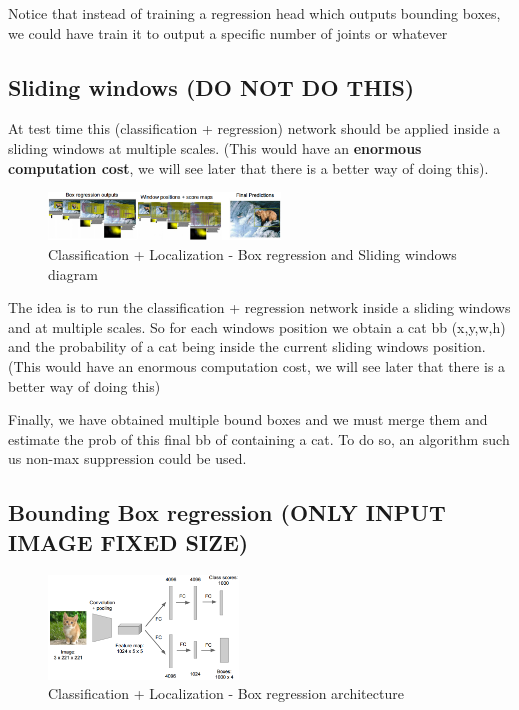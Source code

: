Notice that instead of training a regression head which outputs bounding boxes, we could have train it to output a specific number of joints or whatever

\subsection*{Sliding windows (DO NOT DO THIS)}
At test time this (classification + regression) network should be applied inside a sliding windows at multiple scales. (This would have an \textbf{enormous computation cost}, we will see later that there is a better way of doing this).

\begin{figure}[h]
  \centering
  \includegraphics[width=0.55\textwidth]{Images/applications/28.png}
  \caption{Classification + Localization - Box regression and Sliding windows diagram}
\end{figure}

The idea is to run the classification + regression network inside a sliding windows and at multiple scales. So for each windows position we obtain a cat bb (x,y,w,h) and the probability of a cat being inside the current sliding windows position. (This would have an enormous computation cost, we will see later that there is a better way of doing this)

Finally, we have obtained multiple bound boxes and we must merge them and estimate the prob of this final bb of containing a cat. To do so, an algorithm such us non-max suppression could be used.

\subsection*{Bounding Box regression (ONLY INPUT IMAGE FIXED SIZE)}
\begin{figure}[h]
  \centering
  \includegraphics[width=0.45\textwidth]{Images/applications/8.png}
  \caption{Classification + Localization - Box regression architecture}
\end{figure}

